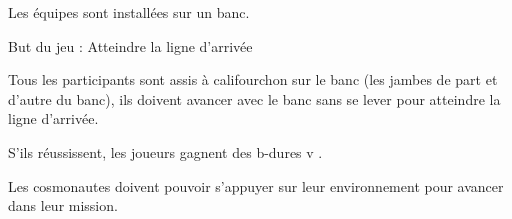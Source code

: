 \documentclass{grand-jeu}
\begin{document}
\begin{liste-materiel}
\end{liste-materiel}

\begin{installation}
Les équipes sont installées sur un banc.
\end{installation}

\begin{regles}
But du jeu : Atteindre la ligne d’arrivée

Tous les participants sont assis à califourchon sur le banc (les jambes de part et d’autre du banc), ils doivent avancer avec le banc sans se lever pour atteindre la ligne d’arrivée.

S'ils réussissent, les joueurs gagnent des b-dures v . 
\end{regles}

\begin{imaginaire}
Les cosmonautes doivent pouvoir s'appuyer sur leur environnement pour avancer dans leur mission. 
\end{imaginaire}

\begin{moments-stop}
\end{moments-stop}
\end{document}

